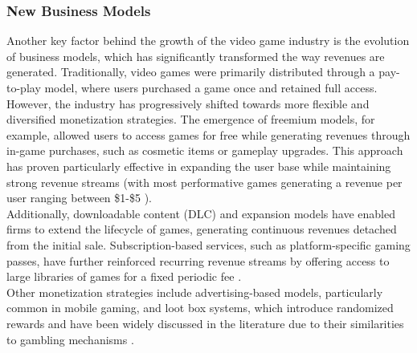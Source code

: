\subsubsection{New Business Models}
Another key factor behind the growth of the video game industry is the evolution of business models, which has significantly transformed the way revenues are generated. Traditionally, video games were primarily distributed through a pay-to-play model, where users purchased a game once and retained full access. \\
However, the industry has progressively shifted towards more flexible and diversified monetization strategies. The emergence of freemium models, for example, allowed users to access games for free while generating revenues through in-game purchases, such as cosmetic items or gameplay upgrades. This approach has proven particularly effective in expanding the user base while maintaining strong revenue streams (with most performative games generating a revenue per user ranging between \$1-\$5 \citep{freemium_game_models}). \\
Additionally, downloadable content (DLC) and expansion models have enabled firms to extend the lifecycle of games, generating continuous revenues detached from the initial sale. Subscription-based services, such as platform-specific gaming passes, have further reinforced recurring revenue streams by offering access to large libraries of games for a fixed periodic fee \citep{xbox_game_pass, playstation_plus}. \\
Other monetization strategies include advertising-based models, particularly common in mobile gaming, and loot box systems, which introduce randomized rewards and have been widely discussed in the literature due to their similarities to gambling mechanisms \citep{LootBox_Model}.\\
\\\\

